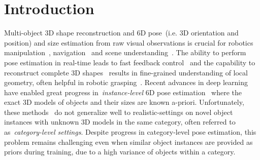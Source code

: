 \documentclass[letter, 10pt, conference]{ieeeconf}
\begin{document}
\section{Introduction}

Multi-object 3D shape reconstruction and  6D pose~(i.e. 3D orientation and position) and size estimation from raw visual observations is crucial for robotics manipulation~\cite{cifuentes2016probabilistic, jiang2021synergies, laskey2021simnet}, navigation~\cite{qi2018frustum, chen20153d} and scene understanding~\cite{zhang2021holistic, Nie_2020_CVPR}. The ability to perform pose estimation in real-time leads to fast feedback control~\cite{kappler2018real} and the capability to reconstruct complete 3D shapes~\cite{ kuo2020mask2cad, niemeyer2020differentiable, mescheder2019occupancy} results in fine-grained understanding of local geometry, often helpful in robotic grasping~\cite{jiang2021synergies, ferrari1992planning}. Recent advances in deep learning have enabled great progress in~\textit{instance-level} 6D pose estimation~\cite{kehl2017ssd, rad2017bb8, xiang2018posecnn} where the exact 3D models of objects and their sizes are known a-priori. Unfortunately, these methods~\cite{tekin2018real, peng2019pvnet, wang2019densefusion} do not generalize well to realistic-settings on novel object instances with unknown 3D models in the same category, often referred to as~\textit{category-level settings}. Despite progress in category-level pose estimation, this problem remains challenging even when similar object instances are provided as priors during training, due to a high variance of objects within a category.
\end{document}
